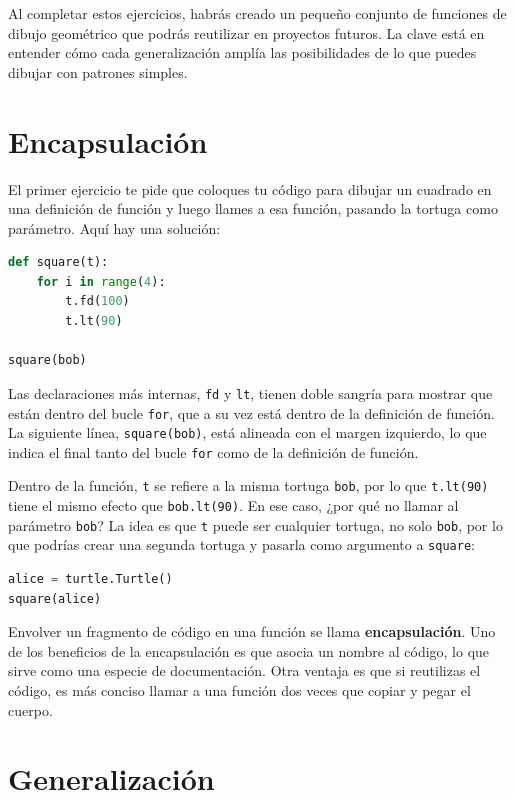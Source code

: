 Al completar estos ejercicios, habrás creado un pequeño conjunto de funciones de dibujo geométrico que podrás reutilizar en proyectos futuros. La clave está en entender cómo cada generalización amplía las posibilidades de lo que puedes dibujar con patrones simples.

\section{Encapsulación}

El primer ejercicio te pide que coloques tu código para dibujar un cuadrado en una definición de función y luego llames a esa función, pasando la tortuga como parámetro. Aquí hay una solución:

\begin{lstlisting}[language=Python]
def square(t):
    for i in range(4):
        t.fd(100)
        t.lt(90)

square(bob)
\end{lstlisting}

Las declaraciones más internas, \texttt{fd} y \texttt{lt}, tienen doble sangría para mostrar que están dentro del bucle \texttt{for}, que a su vez está dentro de la definición de función. La siguiente línea, \texttt{square(bob)}, está alineada con el margen izquierdo, lo que indica el final tanto del bucle \texttt{for} como de la definición de función.

Dentro de la función, \texttt{t} se refiere a la misma tortuga \texttt{bob}, por lo que \texttt{t.lt(90)} tiene el mismo efecto que \texttt{bob.lt(90)}. En ese caso, ¿por qué no llamar al parámetro \texttt{bob}? La idea es que \texttt{t} puede ser cualquier tortuga, no solo \texttt{bob}, por lo que podrías crear una segunda tortuga y pasarla como argumento a \texttt{square}:

\begin{lstlisting}[language=Python]
alice = turtle.Turtle()
square(alice)
\end{lstlisting}

Envolver un fragmento de código en una función se llama \textbf{encapsulación}. Uno de los beneficios de la encapsulación es que asocia un nombre al código, lo que sirve como una especie de documentación. Otra ventaja es que si reutilizas el código, es más conciso llamar a una función dos veces que copiar y pegar el cuerpo.

\section{Generalización}

